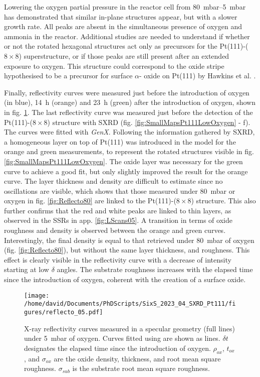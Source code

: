 Lowering the oxygen partial pressure in the reactor cell from \qtyrange{80}{5}{\milli\bar} has demonstrated that similar in-plane structures appear, but with a slower growth rate.
All peaks are absent in the simultaneous presence of oxygen and ammonia in the reactor.
Additional studies are needed to understand if whether or not the rotated hexagonal structures act only as precursors for the Pt(111)-($8\times8$) superstructure, or if those peaks are still present after an extended exposure to oxygen.
This structure could correspond to the oxide stripe hypothesised to be a precursor for surface $\alpha$- oxide on Pt(111) by Hawkins et al. \parencite*{Hawkins2009}.

Finally, reflectivity curves were measured just before the introduction of oxygen (in blue), \qty{14}{\hour} (orange) and \qty{23}{\hour} (green) after the introduction of oxygen, shown in fig. \ref{fig:Reflecto5}.
The last reflectivity curve was measured just before the detection of the Pt(111)-($8\times8$) structure with SXRD (fig. \ref{fig:SmallMapsPt111LowOxygen} - f).
The curves were fitted with \textit{GenX}.
Following the information gathered by SXRD, a homogeneous layer on top of Pt(111) was introduced in the model for the orange and green measurements, to represent the rotated structures visible in fig. \ref{fig:SmallMapsPt111LowOxygen}.
The oxide layer was necessary for the green curve to achieve a good fit, but only slightly improved the result for the orange curve.
The layer thickness and density are difficult to estimate since no oscillations are visible, which shows that those measured under \qty{80}{\milli\bar} or oxygen in fig. \ref{fig:Reflecto80} are linked to the Pt(111)-($8\times8$) structure.
This also further confirms that the red and white peaks are linked to thin layers, as observed in the SSRs in app. \ref{fig:LScans05}.
A transition in terms of oxide roughness and density is observed between the orange and green curves.
Interestingly, the final density is equal to that retrieved under \qty{80}{\milli\bar} of oxygen (fig. \ref{fig:Reflecto80}), but without the same layer thickness, and roughness.
This effect is clearly visible in the reflectivity curve with a decrease of intensity starting at low $\delta$ angles.
The substrate roughness increases with the elapsed time since the introduction of oxygen, coherent with the creation of a surface oxide.

\begin{figure}[!htb]
    \centering
    \texttt{[image: /home/david/Documents/PhDScripts/SixS\_2023\_04\_SXRD\_Pt111/figures/reflecto\_05.pdf]}
    \caption{
    	X-ray reflectivity curves measured in a specular geometry (full lines) under \qty{5}{\milli\bar} of oxygen.
        Curves fitted using  are shown as lines.
        $\delta t$ designates the elapsed time since the introduction of oxygen.
        $\rho_{ox}$, $t_{ox}$, and $\sigma_{ox}$ are the oxide density, thickness, and root mean square roughness.
        $\sigma_{sub}$ is the substrate root mean square roughness.
    }
    \label{fig:Reflecto5}
\end{figure}

